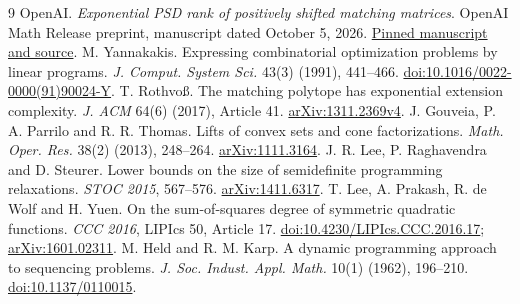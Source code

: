 \documentclass[11pt]{article}
\begin{document}
\begin{thebibliography}{9}
 OpenAI. \emph{Exponential PSD rank of positively shifted matching matrices}. OpenAI Math Release preprint, manuscript dated October 5, 2026. \href{https://github.com/openai/math/blob/adc7f1241b42e322a6451854ab7e4b4c146bf78a/preprints/Exponential-PSD-rank-of-positively-shifted-matching-matrices-October-5-2026/shifted-matching-psd.pdf}{Pinned manuscript and source}.
 M. Yannakakis. Expressing combinatorial optimization problems by linear programs. \emph{J. Comput. System Sci.} 43(3) (1991), 441--466. \href{https://doi.org/10.1016/0022-0000(91)90024-Y}{doi:10.1016/0022-0000(91)90024-Y}.
 T. Rothvo\ss. The matching polytope has exponential extension complexity. \emph{J. ACM} 64(6) (2017), Article 41. \href{https://arxiv.org/abs/1311.2369v4}{arXiv:1311.2369v4}.
 J. Gouveia, P. A. Parrilo and R. R. Thomas. Lifts of convex sets and cone factorizations. \emph{Math. Oper. Res.} 38(2) (2013), 248--264. \href{https://arxiv.org/abs/1111.3164}{arXiv:1111.3164}.
 J. R. Lee, P. Raghavendra and D. Steurer. Lower bounds on the size of semidefinite programming relaxations. \emph{STOC 2015}, 567--576. \href{https://arxiv.org/abs/1411.6317}{arXiv:1411.6317}.
 T. Lee, A. Prakash, R. de Wolf and H. Yuen. On the sum-of-squares degree of symmetric quadratic functions. \emph{CCC 2016}, LIPIcs 50, Article 17. \href{https://doi.org/10.4230/LIPIcs.CCC.2016.17}{doi:10.4230/LIPIcs.CCC.2016.17}; \href{https://arxiv.org/abs/1601.02311}{arXiv:1601.02311}.
 M. Held and R. M. Karp. A dynamic programming approach to sequencing problems. \emph{J. Soc. Indust. Appl. Math.} 10(1) (1962), 196--210. \href{https://doi.org/10.1137/0110015}{doi:10.1137/0110015}.
\end{thebibliography}
\end{document}
